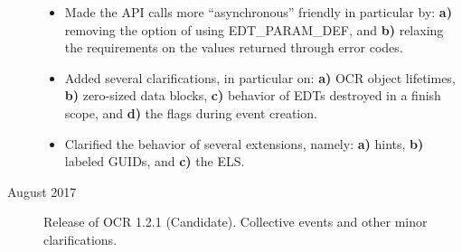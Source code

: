 \begin{description}
\begin{itemize}
\item{Made the API calls more ``asynchronous'' friendly in particular by: {\bf a)} removing the
option of using EDT\_PARAM\_DEF, and {\bf b)} relaxing the requirements on the values returned
through error codes.}
\item{Added several clarifications, in particular on: {\bf a)} OCR object lifetimes,
{\bf b)} zero-sized data blocks, {\bf c)} behavior of EDTs destroyed in a finish scope, and
{\bf d)} the flags during event creation.}
\item{Clarified the behavior of several extensions, namely: {\bf a)} hints, {\bf b)} labeled GUIDs,
and {\bf c)} the ELS.}
\end{itemize}
\item[August 2017] Release of OCR 1.2.1 (Candidate). Collective events and other minor
clarifications.
\end{description}

